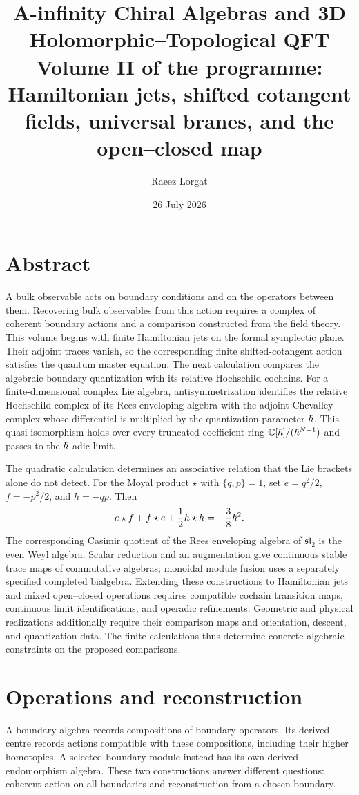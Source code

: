 \documentclass[11pt,twoside,openright]{memoir}
\title{\texorpdfstring{\textbf{A-infinity Chiral Algebras and 3D Holomorphic--Topological QFT}\\[0.55em]\Large Volume II of the programme: Hamiltonian jets, shifted cotangent fields, universal branes, and the open--closed map}{A-infinity Chiral Algebras and 3D Holomorphic--Topological QFT: Volume II of the programme: Hamiltonian jets, shifted cotangent fields, universal branes, and the open--closed map}}
\author{Raeez Lorgat}
\date{26 July 2026}
\begin{document}
\frontmatter
\maketitle
\thispagestyle{empty}
\cleardoublepage
\chapter*{Abstract}

A bulk observable acts on boundary conditions and on the operators between them. Recovering bulk observables from this action requires a complex of coherent boundary actions and a comparison constructed from the field theory. This volume begins with finite Hamiltonian jets on the formal symplectic plane. Their adjoint traces vanish, so the corresponding finite shifted-cotangent action satisfies the quantum master equation. The next calculation compares the algebraic boundary quantization with its relative Hochschild cochains. For a finite-dimensional complex Lie algebra, antisymmetrization identifies the relative Hochschild complex of its Rees enveloping algebra with the adjoint Chevalley complex whose differential is multiplied by the quantization parameter $\hbar$. This quasi-isomorphism holds over every truncated coefficient ring $\mathbb C[\hbar]/(\hbar^{N+1})$ and passes to the $\hbar$-adic limit.

The quadratic calculation determines an associative relation that the Lie brackets alone do not detect. For the Moyal product $\star$ with $\{q,p\}=1$, set $e=q^2/2$, $f=-p^2/2$, and $h=-qp$. Then
\[
 e\star f+f\star e+\frac12h\star h=-\frac38\hbar^2.
\]
The corresponding Casimir quotient of the Rees enveloping algebra of $\mathfrak{sl}_2$ is the even Weyl algebra. Scalar reduction and an augmentation give continuous stable trace maps of commutative algebras; monoidal module fusion uses a separately specified completed bialgebra. Extending these constructions to Hamiltonian jets and mixed open--closed operations requires compatible cochain transition maps, continuous limit identifications, and operadic refinements. Geometric and physical realizations additionally require their comparison maps and orientation, descent, and quantization data. The finite calculations thus determine concrete algebraic constraints on the proposed comparisons.

\chapter*{Operations and reconstruction}
A boundary algebra records compositions of boundary operators. Its derived centre records actions compatible with these compositions, including their higher homotopies. A selected boundary module instead has its own derived endomorphism algebra. These two constructions answer different questions: coherent action on all boundaries and reconstruction from a chosen boundary.
\end{document}
